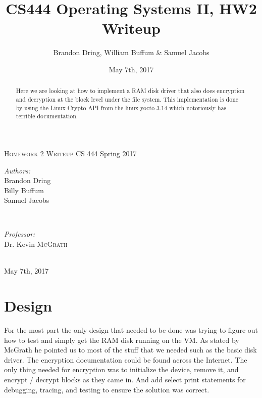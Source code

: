 \documentclass{article}
\title{CS444 Operating Systems II, HW2 Writeup}
\author{Brandon Dring, William Buffum \& Samuel Jacobs}
\date{May 7th, 2017}
\begin{document}
\begin{titlepage}

\center

\textsc{\LARGE \hspace{15mm} Homework 2 Writeup} \newline \newline
{\large CS 444 Spring 2017}



\begin{minipage}{0.4\textwidth}
   \begin{flushleft} \large
      \emph{Authors:}\\
      Brandon Dring \\
      Billy Buffum \\
      Samuel Jacobs
   \end{flushleft}
\end{minipage}
~
\begin{minipage}{0.4\textwidth}
   \begin{flushright} \large
      \emph{Professor:} \\
      Dr. Kevin \textsc{McGrath} %
   \end{flushright}
\end{minipage} \\ [4cm]

{\large May 7th, 2017}
\vfill %

\begin{abstract}
    Here we are looking at how to implement a RAM disk driver that also does encryption and decryption at the block level under the file system. This implementation is done by using the Linux Crypto API from the linux-yocto-3.14 which notoriously has terrible documentation.
\end{abstract}

\pagebreak

\end{titlepage}
\newpage
{}
\setlength{\pdfpageheight}{\paperheight}
\setlength{\pdfpagewidth}{\paperwidth}


\section{Design}
    For the most part the only design that needed to be done was trying to figure out how to test and simply get the RAM disk running on the VM. As stated by McGrath he pointed us to most of the stuff that we needed such as the basic disk driver. The encryption documentation could be found across the Internet. The only thing needed for encryption was to initialize the device, remove it, and encrypt / decrypt blocks as they came in. And add select print statements for debugging, tracing, and testing to ensure the solution was correct.
\end{document}

